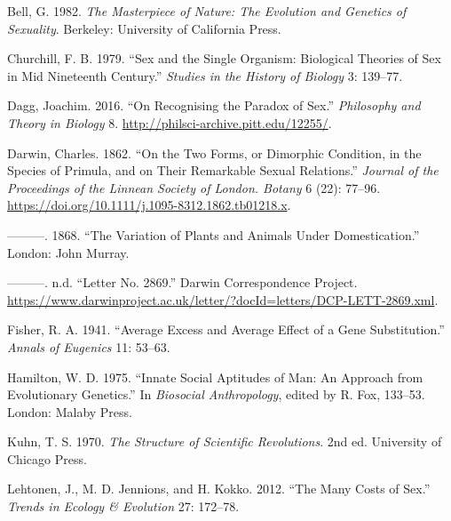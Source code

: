 \documentclass[
  letterpaper,
]{book}
\newlength{\cslhangindent}
\newlength{\cslentryspacingunit} %
\newenvironment{CSLReferences}[2] %
 {%
  \setlength{\parindent}{0pt}
  \ifodd #1
  \let\oldpar\par
  \def\par{\hangindent=\cslhangindent\oldpar}
  \fi
  \setlength{\parskip}{#2\cslentryspacingunit}
 }%
 {}
\begin{document}
\hypertarget{refs}{}
\begin{CSLReferences}{1}{0}
\leavevmode{}%
Bell, G. 1982. \emph{The Masterpiece of Nature: The Evolution and
Genetics of Sexuality}. Berkeley: University of California Press.

\leavevmode{}%
Churchill, F. B. 1979. {``Sex and the Single Organism: Biological
Theories of Sex in Mid Nineteenth Century.''} \emph{Studies in the
History of Biology} 3: 139--77.

\leavevmode{}%
Dagg, Joachim. 2016. {``On Recognising the Paradox of Sex.''}
\emph{Philosophy and Theory in Biology} 8.
\url{http://philsci-archive.pitt.edu/12255/}.

\leavevmode{}%
Darwin, Charles. 1862. {``On the Two Forms, or Dimorphic Condition, in
the Species of Primula, and on Their Remarkable Sexual Relations.''}
\emph{Journal of the Proceedings of the Linnean Society of London.
Botany} 6 (22): 77--96.
\url{https://doi.org/10.1111/j.1095-8312.1862.tb01218.x}.

\leavevmode{}%
---------. 1868. {``The Variation of Plants and Animals Under
Domestication.''} London: John Murray.

\leavevmode{}%
---------. n.d. {``Letter No. 2869.''} Darwin Correspondence Project.
\url{https://www.darwinproject.ac.uk/letter/?docId=letters/DCP-LETT-2869.xml}.

\leavevmode{}%
Fisher, R. A. 1941. {``Average Excess and Average Effect of a Gene
Substitution.''} \emph{Annals of Eugenics} 11: 53--63.

\leavevmode{}%
Hamilton, W. D. 1975. {``Innate Social Aptitudes of Man: An Approach
from Evolutionary Genetics.''} In \emph{Biosocial Anthropology}, edited
by R. Fox, 133--53. London: Malaby Press.

\leavevmode{}%
Kuhn, T. S. 1970. \emph{The Structure of Scientific Revolutions}. 2nd
ed. University of Chicago Press.

\leavevmode{}%
Lehtonen, J., M. D. Jennions, and H. Kokko. 2012. {``The Many Costs of
Sex.''} \emph{Trends in Ecology \& Evolution} 27: 172--78.


\end{CSLReferences}
\end{document}
